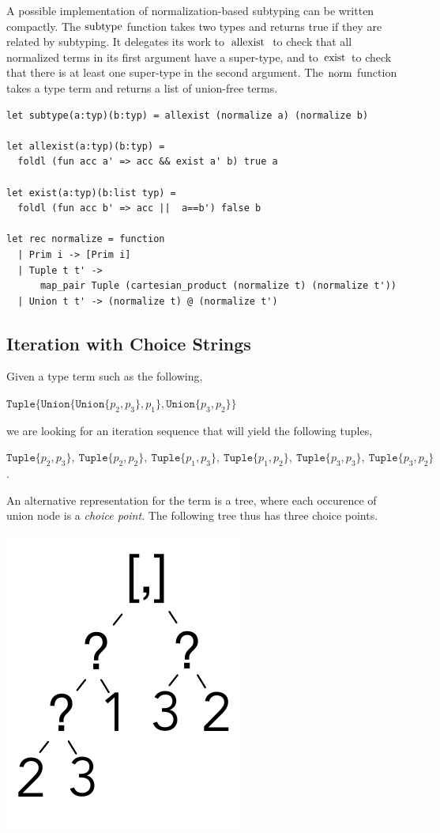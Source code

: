 \documentclass[a4paper,english]{lipics-v2019}
\newcommand{\xt}[1]{\texttt{#1}}
\newcommand{\union}[2]{\xt{Union\{}#1,#2\xt{\}}}
\renewcommand{\c}[1]{\ensuremath{\text{\lstinline{#1}}}\xspace}
\newcommand{\tuple}[1]{\xt{Tuple\{}#1\xt{\}}}
\begin{document}
A possible implementation of normalization-based subtyping can be written
compactly.  The \c{subtype} function takes two types and returns true if
they are related by subtyping. It delegates its work to \c{allexist} to
check that all normalized terms in its first argument have a super-type, and
to \c{exist} to check that there is at least one super-type in the second
argument.  The \c{norm} function takes a type term and returns a list of
union-free terms.

\begin{lstlisting}
let subtype(a:typ)(b:typ) = allexist (normalize a) (normalize b)

let allexist(a:typ)(b:typ) = 
  foldl (fun acc a' => acc && exist a' b) true a

let exist(a:typ)(b:list typ) = 
  foldl (fun acc b' => acc ||  a==b') false b

let rec normalize = function
  | Prim i -> [Prim i]
  | Tuple t t' -> 
      map_pair Tuple (cartesian_product (normalize t) (normalize t'))
  | Union t t' -> (normalize t) @ (normalize t')
\end{lstlisting}


\subsection{Iteration with Choice Strings}\label{cs}

Given a type term such as the following,

\medskip
$\tuple{ \union{ \union{p_2}{p_3} }{p_1}, \union{p_3}{p_2}}$
\medskip

\noindent
we are looking for an iteration sequence that will yield the following tuples,

\medskip
\noindent $\tuple{p_2,p_3}, ~ \tuple{p_2,p_2}, ~ \tuple{p_1,p_3}, ~ \tuple{p_1,p_2}, ~
  \tuple{p_3,p_3}, ~ \tuple{p_3,p_2}$.
\medskip\vspace{-3mm}

\noindent
An alternative representation for the term is a tree, where each occurence
of union node is a \emph{choice point}. The following tree thus has three
choice points.
\medskip

\includegraphics[scale=.25]{figures/tree1.pdf}
\smallskip
\end{document}
